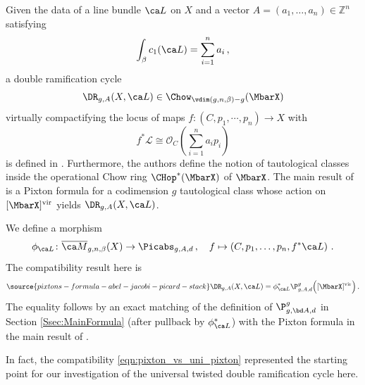 Given the data of a line bundle $\ca L$ on $X$ and a vector $A=(a_1,\ldots, a_n) \in \mathbb{Z}^n$ satisfying
\[\int_{\beta}c_1(\ca L)=\sum_{i=1}^{n}a_i \, ,\]
a double ramification cycle
\[\DR_{g,A}(X,\ca L) \in \Chow_{\vdim(g,n,\beta)-g}(\MbarX)\]
virtually compactifying the locus of maps $f\colon (C,p_1,\cdots,p_n)\to X$ with
\[f^* \mathcal{L} \cong \mathcal{O}_C \left(\sum_{i=1}^n a_i p_i \right)\]
is defined in \cite{Janda2018Double-ramifica}.
Furthermore, the authors define the notion of tautological classes
inside the operational Chow ring $\CHop^*(\MbarX)$ of $\MbarX$.
The main result of \cite{Janda2018Double-ramifica} is a
Pixton  formula for a
codimension $g$ tautological class   whose action on $[\MbarX]^\textup{vir}$ yields $\DR_{g,A}(X,\ca L)$.


We define a morphism
\begin{equation*}
\phi_{\ca L}\colon \Mbar_{g,n,\beta}(X) \to \Picabs_{g,A,d}\, , \ \ \  f \mapsto \left(C, p_1, \ldots, p_n, f^*\ca L \right)\, .
\end{equation*}
The compatibility result here is
\begin{equation}\label{eqn:pixton_vs_uni_pixton}
\source{pixtons-formula-abel-jacobi-picard-stack}
\DR_{g,A}(X,\ca L) = \phi_{\ca L}^* \P^g_{g,A,d} \Big( [\MbarX]^\textup{vir}\Big)\, .
\end{equation}
The equality follows by an exact matching of the definition of
$\P^g_{g,\bd A,d}$ in Section \ref{Ssec:MainFormula}
(after pullback by $\phi_{\ca L}^*$) with the
Pixton formula in the main result of \cite{Janda2018Double-ramifica}.

In fact, the compatibility \eqref{eqn:pixton_vs_uni_pixton}
represented the starting point for our investigation of the
universal twisted double ramification cycle here.

